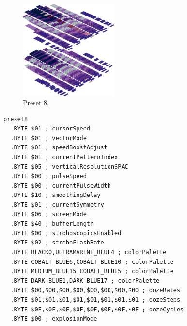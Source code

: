 \vspace*{0.5cm}
\begin{minipage}[b]{0.48\linewidth}
\begin{figure}[H]                                                          
  \centering                                                             
  \begin{adjustbox}{width=5cm,center}                                   
  \includegraphics[width=5cm]{src/colorspace_presets/preset8-45.png}%
  \end{adjustbox}                                                        
\caption*{Preset 8.}                                           
\end{figure}                                                               
\end{minipage}
\hspace{0.1cm}
\begin{minipage}[b]{0.48\linewidth}                                                                         
\begin{lstlisting}[basicstyle=\ttfamily\tiny]
preset8
  .BYTE $01 ; cursorSpeed
  .BYTE $01 ; vectorMode
  .BYTE $01 ; speedBoostAdjust
  .BYTE $01 ; currentPatternIndex
  .BYTE $05 ; verticalResolutionSPAC
  .BYTE $00 ; pulseSpeed
  .BYTE $00 ; currentPulseWidth
  .BYTE $10 ; smoothingDelay
  .BYTE $01 ; currentSymmetry
  .BYTE $06 ; screenMode
  .BYTE $40 ; bufferLength
  .BYTE $00 ; stroboscopicsEnabled
  .BYTE $02 ; stroboFlashRate
  .BYTE BLACK0,ULTRAMARINE_BLUE4 ; colorPalette
  .BYTE COBALT_BLUE6,COBALT_BLUE10 ; colorPalette
  .BYTE MEDIUM_BLUE15,COBALT_BLUE5 ; colorPalette
  .BYTE DARK_BLUE1,DARK_BLUE17 ; colorPalette
  .BYTE $00,$00,$00,$00,$00,$00,$00,$00 ; oozeRates
  .BYTE $01,$01,$01,$01,$01,$01,$01,$01 ; oozeSteps
  .BYTE $0F,$0F,$0F,$0F,$0F,$0F,$0F,$0F ; oozeCycles
  .BYTE $00 ; explosionMode
\end{lstlisting}
\end{minipage}


